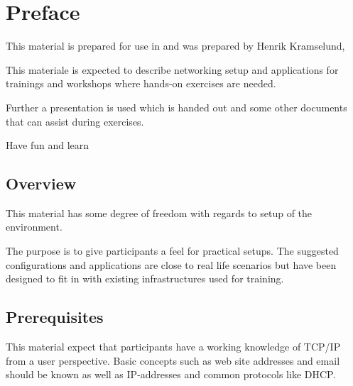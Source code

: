 \documentclass[a4paper,11pt,notitlepage]{report}
\begin{document}

\newcommand{\emne}[1]{hacker workshop}
\newcommand{\kursus}[1]{ethical hacker workshop}
\newcommand{\kursusnavn}[1]{ethical hacker workshop\\ exercises}





\setlength{\parskip}{0pt}

\setcounter{tocdepth}{0}

\normal

{\color{titlecolor}\tableofcontents}

\normal
\pagestyle{fancyplain}
\chapter*{\color{titlecolor}Preface}
This material is prepared for use in \emph{\kursus} and was prepared by
Henrik Kramselund, 

This materiale is expected to describe networking setup and
applications for trainings and workshops where hands-on exercises are needed.

Further a presentation is used which is handed out and some other documents that can assist during exercises.

\vskip 1cm
Have fun and learn

\section*{\color{titlecolor}Overview}
\setlength{\parskip}{10pt}

This material has some degree of freedom with regards to setup of the environment.

The purpose is to give participants a feel for practical setups. The suggested configurations
and applications are close to real life scenarios but have been designed to fit in with existing infrastructures used for training.


\section*{\color{titlecolor}Prerequisites}

This material expect that participants have a working knowledge of
TCP/IP from a user perspective. Basic concepts such as web site addresses and email should be known as well as IP-addresses and common protocols like DHCP.
\end{document}
